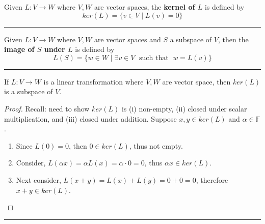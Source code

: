 \begin{definition}  Given $L:V \to W$ where $V, W$ are vector spaces, the \textbf{kernel of $L$} is defined by 
\[ ker(L) = \{ v \in V \; | \; L(v) = 0 \} \]
\end{definition}




\rule[0.01in]{\textwidth}{0.0025in}





\begin{definition}
Given $L:V \to W$ where $V, W$ are vector spaces and $S$ a subspace of $V$, then the \textbf{image of $S$ under $L$} is defined by 
\[  L(S) = \{ w \in W \;  |  \;   \exists v \in V \; \text{ such that }  \;  w=L(v) \} \]

\end{definition}



\rule[0.01in]{\textwidth}{0.0025in}



\begin{theorem}
 If $L:V \to W$ is a linear transformation where $V, W$ are vector space, then $ker(L)$ is a subspace of $V$.  
 
 \begin{proof}
 Recall: need to show $ker(L)$ is (i) non-empty, (ii) closed under scalar multiplication, and (iii) closed under addition.   Suppose $x, y \in ker(L)$ and $\alpha \in \mathbb{F}$. 
 
 \begin{enumerate}
 	\item Since $L(0) = 0$, then $0 \in ker(L)$, thus not empty.   
	
	\item Consider, $L(\alpha x) = \alpha L(x) = \alpha \cdot 0 = 0$, thus $\alpha x \in ker(L)$.    
	
	\item Next consider, $L(x+y) = L(x) + L(y) = 0+ 0 = 0$, therefore $x+y \in ker(L)$.
	
	
 \end{enumerate}
 \end{proof}  
\end{theorem}


\rule[0.01in]{\textwidth}{0.0025in}



